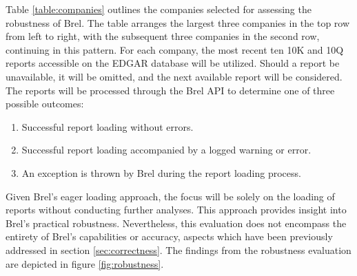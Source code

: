 

Table \ref{table:companies} outlines the companies selected for assessing the robustness of Brel.
The table arranges the largest three companies in the top row from left to right, with the subsequent three companies in the second row, continuing in this pattern.
For each company, the most recent ten 10K and 10Q reports accessible on the EDGAR database\cite{sec_edgar} will be utilized.
Should a report be unavailable, it will be omitted, and the next available report will be considered.
The reports will be processed through the Brel API to determine one of three possible outcomes:

\begin{enumerate}
\item Successful report loading without errors.
\item Successful report loading accompanied by a logged warning or error.
\item An exception is thrown by Brel during the report loading process.
\end{enumerate}

Given Brel's eager loading approach, the focus will be solely on the loading of reports without conducting further analyses.
This approach provides insight into Brel's practical robustness.
Nevertheless, this evaluation does not encompass the entirety of Brel's capabilities or accuracy, aspects which have been previously addressed in section \ref{sec:correctness}.
The findings from the robustness evaluation are depicted in figure \ref{fig:robustness}.

